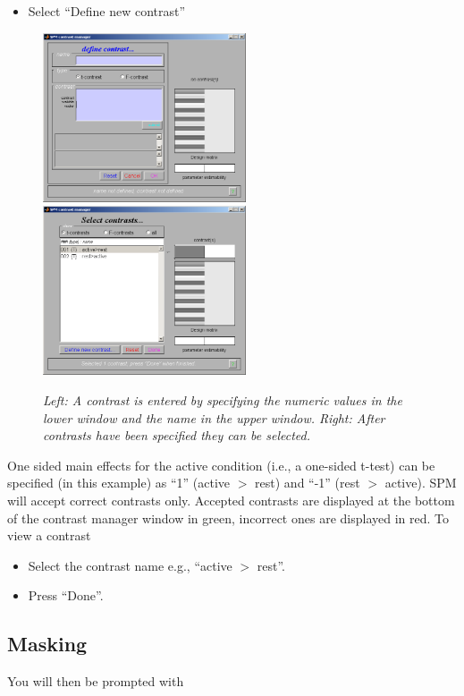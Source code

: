 \begin{itemize}
\item{Select ``Define new contrast''}
\end{itemize}
\begin{figure}
\includegraphics[width=60mm]{auditory/con_man2}
\includegraphics[width=60mm]{auditory/con_man3}
\caption{\emph{Left: A contrast is entered by specifying the numeric values in the lower window and the name in the upper window. Right: After contrasts have been specified they can be selected.}}
\end{figure}

One sided main effects for the active condition (i.e., a one-sided t-test) can be specified (in this example) as ``1'' (active $>$ rest) and ``-1'' (rest $>$ active). SPM will accept correct contrasts only. Accepted contrasts are displayed at the bottom of the contrast manager window in green, incorrect ones are displayed in red. To view a contrast

\begin{itemize}
\item Select the contrast name e.g., ``active $>$ rest''.
\item Press ``Done''.
\end{itemize}

\subsection{Masking}

You will then be prompted with

